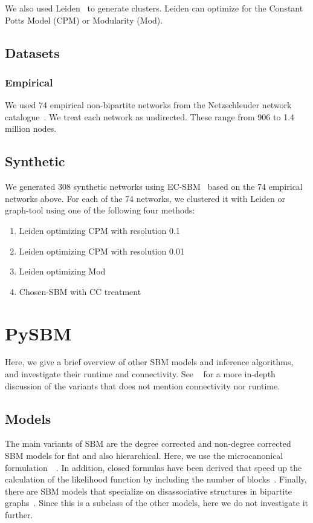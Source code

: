 \documentclass[aps,pre,superscriptaddress]{article}
\begin{document}
We also used Leiden~\cite{traag19-03} to generate clusters.
Leiden can optimize for the Constant Potts Model (CPM) or Modularity (Mod).

\subsection{Datasets}

\subsubsection*{Empirical}

We used 74 empirical non-bipartite networks from the Netzschleuder network catalogue~\cite{Netzschleuder}.
We treat each network as undirected.
These range from 906 to 1.4 million nodes.

\subsection{Synthetic}

We generated 308 synthetic networks using EC-SBM~\cite{vule25-02} based on the 74 empirical networks above.
For each of the 74 networks, we clustered it with Leiden or graph-tool using one of the following four methods:
\begin{enumerate}
    \item Leiden optimizing CPM with resolution 0.1
    \item Leiden optimizing CPM with resolution 0.01
    \item Leiden optimizing Mod
    \item Chosen-SBM with CC treatment
\end{enumerate}

\section{PySBM}

Here, we give a brief overview of other SBM models and inference algorithms, and investigate their runtime and connectivity.
See ~\cite{funke19-04} for a more in-depth discussion of the variants that does not mention connectivity nor runtime.

\subsection{Models}

The main variants of SBM are the degree corrected and non-degree corrected SBM models for flat and also hierarchical.
Here, we use the microcanonical formulation~\cite{peixoto17-01}~\cite{peixoto14-03}.
In addition, closed formulas have been derived that speed up the calculation of the likelihood function by including the number of blocks~\cite{come15-12}.
Finally, there are SBM models that specialize on disassociative structures in bipartite graphs~\cite{yen20-09}.
Since this is a subclass of the other models, here we do not investigate it further.
\end{document}
